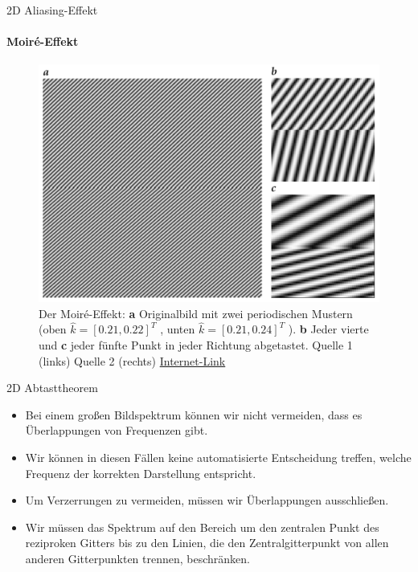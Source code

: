 \documentclass{beamer}
\begin{document}
	\begin{frame}{2D Aliasing-Effekt}
	\framesubtitle{Moiré-Effekt}
	\begin{figure}
		\includegraphics[width=0.7\textheight]{moire.pdf}
		\caption{\footnotesize Der Moiré-Effekt: \textbf{a} Originalbild mit zwei periodischen Mustern (oben $\hat{k} = [0.21, 0.22]^T$ , unten $\hat{k} = [0.21, 0.24]^T$ ). \textbf{b} Jeder vierte und \textbf{c} jeder fünfte Punkt in jeder	Richtung abgetastet. Quelle 1 (links)\cite{bildverarbeitung} Quelle 2 (rechts) \href{https://upload.wikimedia.org/wikipedia/en/4/42/Moir\%C3\%A9.gif}{Internet-Link}}
	\end{figure}
	\end{frame}

	\begin{frame}{2D Abtasttheorem}
	\begin{itemize}
		\item Bei einem großen Bildspektrum können wir nicht vermeiden, dass es Überlappungen von Frequenzen gibt.
		\item Wir können in diesen Fällen keine automatisierte Entscheidung treffen, welche Frequenz der korrekten Darstellung entspricht.
		\item  Um Verzerrungen zu vermeiden, müssen wir Überlappungen ausschließen.
		\item Wir müssen das Spektrum auf den Bereich um den zentralen Punkt des reziproken Gitters bis zu den Linien, die den Zentralgitterpunkt von allen anderen Gitterpunkten trennen, beschränken.
	\end{itemize}
	\end{frame}
\end{document}
